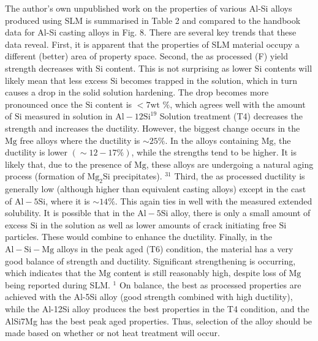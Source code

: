 \documentclass[10pt]{article}
\begin{document}
The author's own unpublished work on the properties of various Al-Si alloys produced using SLM is summarised in Table 2 and compared to the handbook data for Al-Si casting alloys in Fig. 8. There are several key trends that these data reveal. First, it is apparent that the properties of SLM material occupy a different (better) area of property space. Second, the as processed (F) yield strength decreases with $\mathrm{Si}$ content. This is not surprising as lower $\mathrm{Si}$ contents will likely mean that less excess $\mathrm{Si}$ becomes trapped in the solution, which in turn causes a drop in the solid solution hardening. The drop becomes more pronounced once the $\mathrm{Si}$ content is $<7 \mathrm{wt}$ $\%$, which agrees well with the amount of $\mathrm{Si}$ measured in solution in $\mathrm{Al}-12 \mathrm{Si}^{19}$ Solution treatment (T4) decreases the strength and increases the ductility. However, the biggest change occurs in the $\mathrm{Mg}$ free alloys where the ductility is $\sim 25 \%$. In the alloys containing $\mathrm{Mg}$, the ductility is lower $(\sim 12-17 \%)$, while the strengths tend to be higher. It is likely that, due to the presence of $\mathrm{Mg}$, these alloys are undergoing a natural aging process (formation of $\mathrm{Mg}_{2} \mathrm{Si}$ precipitates). ${ }^{31}$ Third, the as processed ductility is generally low (although higher than equivalent casting alloys) except in the cast of $\mathrm{Al}-5 \mathrm{Si}$, where it is $\sim 14 \%$. This again ties in well with the measured extended solubility. It is possible that in the $\mathrm{Al}-5 \mathrm{Si}$ alloy, there is only a small amount of excess $\mathrm{Si}$ in the solution as well as lower amounts of crack initiating free $\mathrm{Si}$ particles. These would combine to enhance the ductility. Finally, in the $\mathrm{Al}-\mathrm{Si}-\mathrm{Mg}$ alloys in the peak aged (T6) condition, the material has a very good balance of strength and ductility. Significant strengthening is occurring, which indicates that the $\mathrm{Mg}$ content is still reasonably high, despite loss of $\mathrm{Mg}$ being reported during SLM. ${ }^{1}$ On balance, the best as processed properties are achieved with the Al-5Si alloy (good strength combined with high ductility), while the Al-12Si alloy produces the best properties in the T4 condition, and the AlSi7Mg has the best peak aged properties. Thus, selection of the alloy should be made based on whether or not heat treatment will occur.
\end{document}
